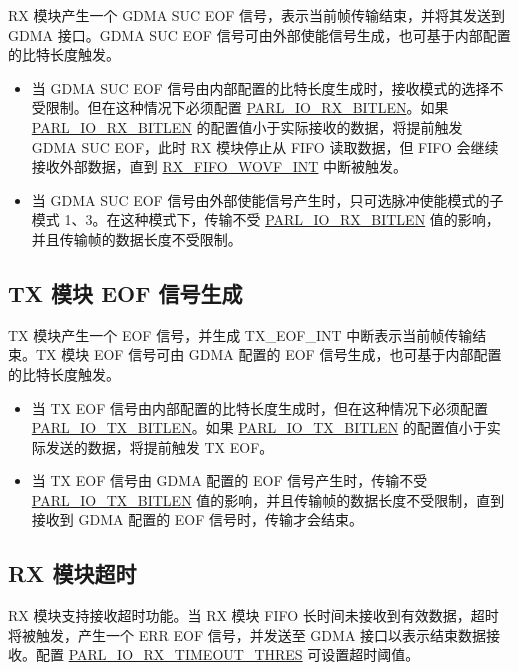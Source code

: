 \documentclass[main\_\_CN.tex]{subfiles}
\begin{document}
RX 模块产生一个 GDMA SUC EOF 信号，表示当前帧传输结束，并将其发送到 GDMA 接口。GDMA SUC EOF 信号可由外部使能信号生成，也可基于内部配置的比特长度触发。

\begin{itemize}
    \item 当 GDMA SUC EOF 信号由内部配置的比特长度生成时，接收模式的选择不受限制。但在这种情况下必须配置 \hyperref[fielddesc:PARLIORXBITLEN]{PARL\_IO\_RX\_BITLEN}。如果 \hyperref[fielddesc:PARLIORXBITLEN]{PARL\_IO\_RX\_BITLEN} 的配置值小于实际接收的数据，将提前触发 GDMA SUC EOF，此时 RX 模块停止从 FIFO 读取数据，但 FIFO 会继续接收外部数据，直到 \hyperref[int:RXFIFOWOVFINT]{RX\_FIFO\_WOVF\_INT} 中断被触发。
    \item 当 GDMA SUC EOF 信号由外部使能信号产生时，只可选脉冲使能模式的子模式 1、3。在这种模式下，传输不受 \hyperref[fielddesc:PARLIORXBITLEN]{PARL\_IO\_RX\_BITLEN} 值的影响，并且传输帧的数据长度不受限制。
\end{itemize}

\subsection{TX 模块 EOF 信号生成}

TX 模块产生一个 EOF 信号，并生成 TX\_EOF\_INT 中断表示当前帧传输结束。TX 模块 EOF 信号可由 GDMA 配置的 EOF 信号生成，也可基于内部配置的比特长度触发。

\begin{itemize}
    \item 当 TX EOF 信号由内部配置的比特长度生成时，但在这种情况下必须配置 \hyperref[fielddesc:PARLIOTXBITLEN]{PARL\_IO\_TX\_BITLEN}。如果 \hyperref[fielddesc:PARLIOTXBITLEN]{PARL\_IO\_TX\_BITLEN} 的配置值小于实际发送的数据，将提前触发 TX EOF。
    \item 当 TX EOF 信号由 GDMA 配置的 EOF 信号产生时，传输不受 \hyperref[fielddesc:PARLIOTXBITLEN]{PARL\_IO\_TX\_BITLEN} 值的影响，并且传输帧的数据长度不受限制，直到接收到 GDMA 配置的 EOF 信号时，传输才会结束。
\end{itemize}

\subsection{RX 模块超时}

RX 模块支持接收超时功能。当 RX 模块 FIFO 长时间未接收到有效数据，超时将被触发，产生一个 ERR EOF 信号，并发送至 GDMA 接口以表示结束数据接收。配置 \hyperref[fielddesc:PARLIORXTIMEOUTTHRES]{PARL\_IO\_RX\_TIMEOUT\_THRES} 可设置超时阈值。
\end{document}
